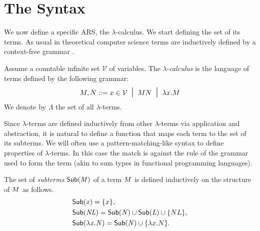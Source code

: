 \section{The Syntax}
We now define a specific ARS, the $\lambda$-calculus. We start defining the set of its terms. As usual in theoretical computer science terms are inductively defined by a context-free grammar \cite{backus_syntax_1959}.
\begin{definition}
	Assume a countable infinite set $\mathcal{V}$ of variables. The
	$\lambda$-\emph{calculus} is the language of terms defined by
	the following grammar:
	$$
	M,N::=x\in\mathcal{V}\; \; \mbox{\Large{$\mid$}}\;\;MN\; \; \mbox{\Large{$\mid$}}\;\;\lambda x.M
	$$
	We denote by $\Lambda$ the set of all $\lambda$-terms.
\end{definition}
Since $\lambda$-terms are defined inductively from other $\lambda$-terms via application and abstraction, it is natural to define a function that maps each term to the set of its subterms. We will often use a pattern-matching-like syntax to define properties of $\lambda$-terms. In this case the match is against the rule of the grammar used to form the term (akin to sum types in functional programming languages).
\begin{THESIS}
	\begin{definition}
		The set of \emph{subterms} $\mathsf{Sub(\mathit{M})}$ of a term $M$ is defined inductively on the structure of $M$ as follows.
		\begin{align*}
		&\mathsf{Sub(\mathit{x})}=\{x\},\\
		&\mathsf{Sub(\mathit{NL})}=\mathsf{Sub(\mathit{N})}\cup \mathsf{Sub(\mathit{L})}\cup\{NL\},\\
		&\mathsf{Sub(\mathit{\lambda x.N})}=\mathsf{Sub(\mathit{N})}\cup \{\lambda x.N\}.
		\end{align*}
	\end{definition}
\end{THESIS}
